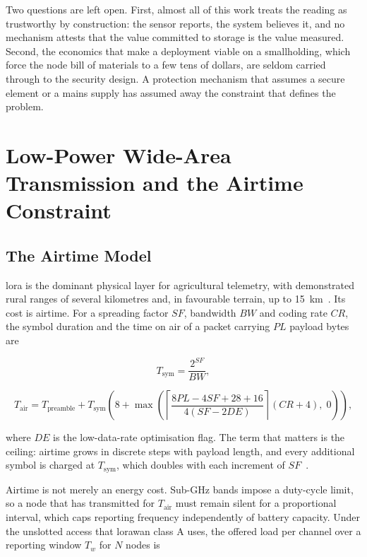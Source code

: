\documentclass[12pt,a4paper,oneside]{book}
\begin{document}
Two questions are left open. First, almost all of this work treats the reading
as trustworthy by construction: the sensor reports, the system believes it, and
no mechanism attests that the value committed to storage is the value measured.
Second, the economics that make a deployment viable on a smallholding, which
force the node bill of materials to a few tens of dollars, are seldom carried
through to the security design. A protection mechanism that assumes a secure
element or a mains supply has assumed away the constraint that defines the
problem.

\section{Low-Power Wide-Area Transmission and the Airtime Constraint}
\label{sec:lit_lora}

\subsection{The Airtime Model}

\gls{lora} is the dominant physical layer for agricultural telemetry, with
demonstrated rural ranges of several kilometres and, in favourable terrain, up
to \SI{15}{\kilo\metre}~\cite{adelantado2017understanding, li2020performance,
raj2017comprehensive}. Its cost is airtime. For a spreading factor $SF$,
bandwidth $BW$ and coding rate $CR$, the symbol duration and the time on air of
a packet carrying $PL$ payload bytes are

\begin{equation}
  T_{\text{sym}} = \frac{2^{SF}}{BW},
  \label{eq:symbol_time}
\end{equation}

\begin{equation}
  T_{\text{air}} = T_{\text{preamble}}
    + T_{\text{sym}}\!\left(8 + \max\!\left(
      \left\lceil \frac{8PL - 4SF + 28 + 16}{4(SF - 2DE)} \right\rceil
      (CR + 4),\; 0 \right)\right),
  \label{eq:airtime}
\end{equation}

where $DE$ is the low-data-rate optimisation flag. The term that matters is the
ceiling: airtime grows in discrete steps with payload length, and every
additional symbol is charged at $T_{\text{sym}}$, which doubles with each
increment of $SF$~\cite{adelantado2017understanding, bor2016lorawan}.

Airtime is not merely an energy cost. Sub-GHz bands impose a duty-cycle limit,
so a node that has transmitted for $T_{\text{air}}$ must remain silent for a
proportional interval, which caps reporting frequency independently of battery
capacity. Under the unslotted access that \gls{lorawan} class A uses, the
offered load per channel over a reporting window $T_w$ for $N$ nodes is
\end{document}
